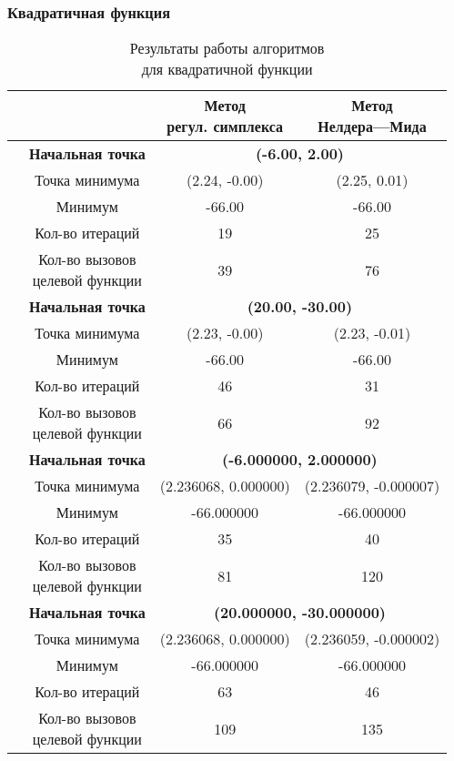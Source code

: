 \subsubsection{Квадратичная функция}

\begin{table}[H]
        \centering
        \vspace*{-1.5em}
        \caption{Результаты работы алгоритмов\\для квадратичной функции}
        \footnotesize
        \begin{tabular}{|c|c|c|c|}
        \hline
        & &\makecell{Метод\\регул. симплекса} &\makecell{Метод\\Нелдера---Мида} \\
        \hline
	\multirow{8}{*}{\rotatebox[origin=c]{90}{$\varepsilon = 0.01$}}&\textbf{Начальная точка} &\multicolumn{2}{c|}{\textbf{(-6.00, 2.00)}}\\
	\cline{2-4}
	&Точка минимума &(2.24, -0.00) &(2.25, 0.01) \\ 
	\cline{2-4}
	&Минимум &-66.00 &-66.00 \\ 
	\cline{2-4}
	&Кол-во итераций &19 &25 \\ 
	\cline{2-4}
	&\makecell{Кол-во вызовов\\целевой функции} &39 &76 \\ 
	\cline{2-4}
\cline{2-4}&\textbf{Начальная точка} &\multicolumn{2}{c|}{\textbf{(20.00, -30.00)}}\\
	\cline{2-4}
	&Точка минимума &(2.23, -0.00) &(2.23, -0.01) \\ 
	\cline{2-4}
	&Минимум &-66.00 &-66.00 \\ 
	\cline{2-4}
	&Кол-во итераций &46 &31 \\ 
	\cline{2-4}
	&\makecell{Кол-во вызовов\\целевой функции} &66 &92 \\ 
	\cline{2-4}
	\hline
	\multirow{8}{*}{\rotatebox[origin=c]{90}{$\varepsilon = 1e-06$}}&\textbf{Начальная точка} &\multicolumn{2}{c|}{\textbf{(-6.000000, 2.000000)}}\\
	\cline{2-4}
	&Точка минимума &(2.236068, 0.000000) &(2.236079, -0.000007) \\ 
	\cline{2-4}
	&Минимум &-66.000000 &-66.000000 \\ 
	\cline{2-4}
	&Кол-во итераций &35 &40 \\ 
	\cline{2-4}
	&\makecell{Кол-во вызовов\\целевой функции} &81 &120 \\ 
	\cline{2-4}
\cline{2-4}&\textbf{Начальная точка} &\multicolumn{2}{c|}{\textbf{(20.000000, -30.000000)}}\\
	\cline{2-4}
	&Точка минимума &(2.236068, 0.000000) &(2.236059, -0.000002) \\ 
	\cline{2-4}
	&Минимум &-66.000000 &-66.000000 \\ 
	\cline{2-4}
	&Кол-во итераций &63 &46 \\ 
	\cline{2-4}
	&\makecell{Кол-во вызовов\\целевой функции} &109 &135 \\ 
	\cline{2-4}
	\hline


\end{tabular}
\end{table}

